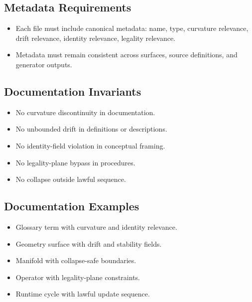 \subsection{Metadata Requirements}
\begin{itemize}
    \item Each file must include canonical metadata: name, type, curvature relevance, drift relevance, identity relevance, legality relevance.
    \item Metadata must remain consistent across surfaces, source definitions, and generator outputs.
\end{itemize}

\subsection{Documentation Invariants}
\begin{itemize}
    \item No curvature discontinuity in documentation.
    \item No unbounded drift in definitions or descriptions.
    \item No identity-field violation in conceptual framing.
    \item No legality-plane bypass in procedures.
    \item No collapse outside lawful sequence.
\end{itemize}

\subsection{Documentation Examples}
\begin{itemize}
    \item Glossary term with curvature and identity relevance.
    \item Geometry surface with drift and stability fields.
    \item Manifold with collapse-safe boundaries.
    \item Operator with legality-plane constraints.
    \item Runtime cycle with lawful update sequence.
\end{itemize}
